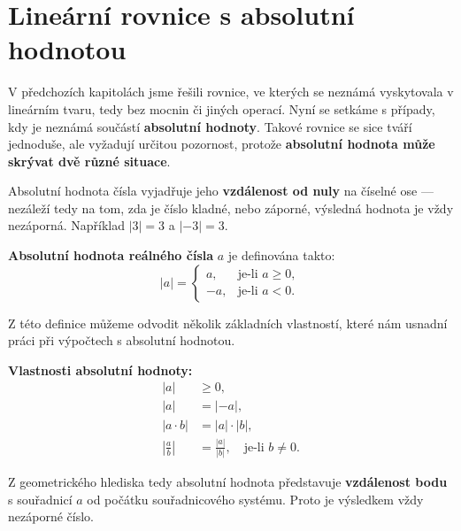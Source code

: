 \documentclass[12pt,a4paper]{article}
\begin{document}
\newpage
\section{Lineární rovnice s absolutní hodnotou}

V předchozích kapitolách jsme řešili rovnice, ve kterých se neznámá vyskytovala v lineárním tvaru, tedy bez mocnin či jiných operací.  
Nyní se setkáme s případy, kdy je neznámá součástí \textbf{absolutní hodnoty}.  
Takové rovnice se sice tváří jednoduše, ale vyžadují určitou pozornost, protože \textbf{absolutní hodnota může skrývat dvě různé situace}.  

\medskip
Absolutní hodnota čísla vyjadřuje jeho \textbf{vzdálenost od nuly} na číselné ose —  
nezáleží tedy na tom, zda je číslo kladné, nebo záporné, výsledná hodnota je vždy nezáporná.  
Například \(|3| = 3\) a \(|-3| = 3\).

\begin{definitionbox}
\textbf{Absolutní hodnota reálného čísla} \(a\) je definována takto:
\[
|a| =
\begin{cases}
a, & \text{je-li } a \ge 0,\\[4pt]
-a, & \text{je-li } a < 0.
\end{cases}
\]
\end{definitionbox}

\noindent
Z této definice můžeme odvodit několik základních vlastností,  
které nám usnadní práci při výpočtech s absolutní hodnotou.

\begin{notebox}
\textbf{Vlastnosti absolutní hodnoty:}
\[
\begin{aligned}
|a| &\ge 0, \\[4pt]
|a| &= |-a|, \\[4pt]
|a \cdot b| &= |a| \cdot |b|, \\[4pt]
\left|\frac{a}{b}\right| &= \frac{|a|}{|b|}, \quad \text{je-li } b \neq 0.
\end{aligned}
\]
\end{notebox}

\noindent
Z geometrického hlediska tedy absolutní hodnota představuje \textbf{vzdálenost bodu} s souřadnicí \(a\) od počátku souřadnicového systému.  
Proto je výsledkem vždy nezáporné číslo.

\begin{center}
\end{center}
\end{document}
